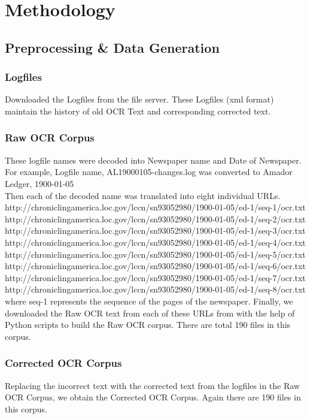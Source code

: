 \documentclass[10pt, conference, compsocconf]{IEEEtran}
\begin{document}
\section{Methodology}
\subsection{Preprocessing \& Data Generation}
\subsubsection{Logfiles} Downloaded the Logfiles from the file server. These Logfiles (xml format) maintain the history of old OCR Text and corresponding corrected text.\\
\subsubsection{Raw OCR Corpus}
These logfile names were decoded into Newspaper name  and Date of Newspaper. \\
For example, Logfile name, AL19000105-changes.log was converted to Amador Ledger, 1900-01-05 \\
Then each of the decoded name was translated into eight individual URLs.\\
http://chroniclingamerica.loc.gov/lccn/sn93052980/1900-01-05/ed-1/seq-1/ocr.txt\\
http://chroniclingamerica.loc.gov/lccn/sn93052980/1900-01-05/ed-1/seq-2/ocr.txt\\
http://chroniclingamerica.loc.gov/lccn/sn93052980/1900-01-05/ed-1/seq-3/ocr.txt\\
http://chroniclingamerica.loc.gov/lccn/sn93052980/1900-01-05/ed-1/seq-4/ocr.txt\\
http://chroniclingamerica.loc.gov/lccn/sn93052980/1900-01-05/ed-1/seq-5/ocr.txt\\
http://chroniclingamerica.loc.gov/lccn/sn93052980/1900-01-05/ed-1/seq-6/ocr.txt\\
http://chroniclingamerica.loc.gov/lccn/sn93052980/1900-01-05/ed-1/seq-7/ocr.txt\\
http://chroniclingamerica.loc.gov/lccn/sn93052980/1900-01-05/ed-1/seq-8/ocr.txt\\
where seq-1 represents the sequence of the pages of the newspaper.
Finally, we downloaded the Raw OCR text from each of these URLs from \cite{datasource} with the help of Python scripts to build the Raw OCR corpus. There are total 190 files in this corpus.\\
\subsubsection{Corrected OCR Corpus}
Replacing the incorrect text with the corrected text from the logfiles in the Raw OCR Corpus, we obtain the Corrected OCR Corpus. Again there are 190 files in this corpus.\\
\end{document}

